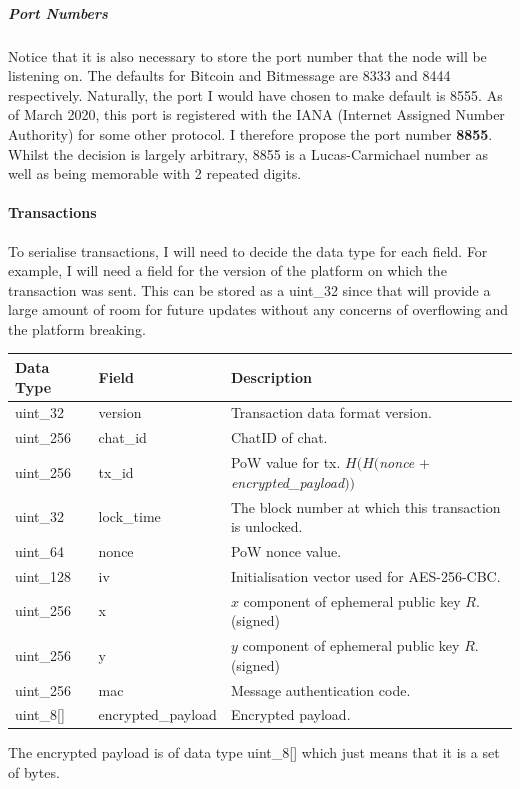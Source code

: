 \documentclass{article}
\begin{document}
\subparagraph{Port Numbers}Notice that it is also necessary to store the port number that the node will be listening on. The defaults for Bitcoin and Bitmessage are 8333 and 8444 respectively. Naturally, the port I would have chosen to make default is 8555. As of March 2020, this port is registered with the IANA (Internet Assigned Number Authority) for some other protocol. I therefore propose the port number \textbf{8855}. Whilst the decision is largely arbitrary, 8855 is a Lucas-Carmichael number as well as being memorable with 2 repeated digits.

\vspace{1cm}

\paragraph{Transactions}
To serialise transactions, I will need to decide the data type for each field. For example, I will need a field for the version of the platform on which the transaction was sent. This can be stored as a uint\_32 since that will provide a large amount of room for future updates without any concerns of overflowing and the platform breaking.

\begin{table}[H]
\centering
\begin{tabular}{|p{1.3cm}|p{3cm}|p{5.5cm}|}
\hline
\rowcolor{tblgrey}
Data Type   & Field       & Description\\ \hline
uint\_32    & version     & Transaction data format version.                          \\ \hline
uint\_256   & chat\_id    & ChatID of chat. \\ \hline
uint\_256   & tx\_id      & PoW value for tx. $H(H($\textit{nonce} + \textit{encrypted\_payload}$))$ \\ \hline
uint\_32    & lock\_time  & The block number at which this transaction is unlocked. \\ \hline
uint\_64    & nonce       & PoW nonce value. \\ \hline
uint\_128   & iv          & Initialisation vector used for AES-256-CBC.   \\ \hline
uint\_256   & x           & $x$ component of ephemeral public key $R$. (signed)    \\ \hline
uint\_256   & y           & $y$ component of ephemeral public key $R$. (signed)    \\ \hline
uint\_256   & mac         & Message authentication code. \\ \hline
uint\_8[\hspace{0.05cm}]  & encrypted\_payload & Encrypted payload. \\ \hline
\end{tabular}
\end{table}
\vspace{-0.5cm}
The encrypted payload is of data type uint\_8[\hspace{0.05cm}] which just means that it is a set of bytes.
\end{document}
